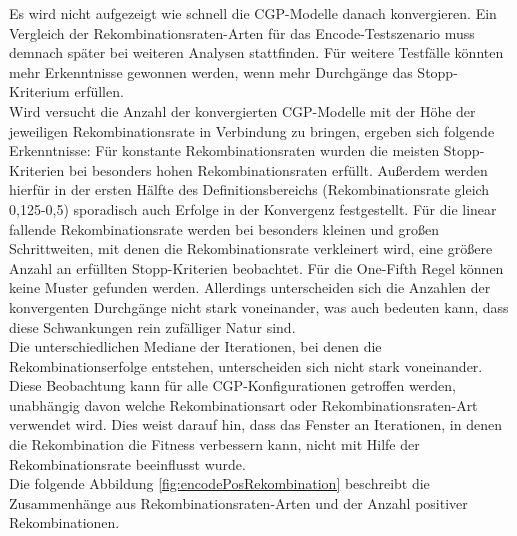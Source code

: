 Es wird nicht aufgezeigt wie schnell die CGP-Modelle danach konvergieren.
Ein Vergleich der Rekombinationsraten-Arten für das Encode-Testszenario muss demnach später bei weiteren Analysen stattfinden.
Für weitere Testfälle könnten mehr Erkenntnisse gewonnen werden, wenn mehr Durchgänge das Stopp-Kriterium erfüllen.\\
Wird versucht die Anzahl der konvergierten CGP-Modelle mit der Höhe der jeweiligen Rekombinationsrate in Verbindung zu bringen, ergeben sich folgende Erkenntnisse: Für konstante Rekombinationsraten wurden die meisten Stopp-Kriterien bei besonders hohen Rekombinationsraten erfüllt. 
Außerdem werden hierfür in der ersten Hälfte des Definitionsbereichs (Rekombinationsrate gleich 0,125-0,5) sporadisch auch Erfolge in der Konvergenz festgestellt.
Für die linear fallende Rekombinationsrate werden bei besonders kleinen und großen Schrittweiten, mit denen die Rekombinationsrate verkleinert wird, eine größere Anzahl an erfüllten Stopp-Kriterien beobachtet.
Für die One-Fifth Regel können keine Muster gefunden werden.
Allerdings unterscheiden sich die Anzahlen der konvergenten Durchgänge nicht stark voneinander, was auch bedeuten kann, dass diese Schwankungen rein zufälliger Natur sind.\\
Die unterschiedlichen Mediane der Iterationen, bei denen die Re\-kom\-bi\-na\-tions\-er\-folge entstehen, unterscheiden sich nicht stark voneinander.
Diese Beobachtung kann für alle CGP-Konfigurationen getroffen werden, unabhängig davon welche Rekombinationsart oder Re\-kom\-bi\-na\-tions\-ra\-ten-Art verwendet wird.
Dies weist darauf hin, dass das Fenster an Iterationen, in denen die Rekombination die Fitness verbessern kann, nicht mit Hilfe der Rekombinationsrate beeinflusst wurde.\\
Die folgende Abbildung \ref{fig:encodePosRekombination} beschreibt die Zusammenhänge aus Rekombinationsraten-Arten und der Anzahl positiver Rekombinationen.

